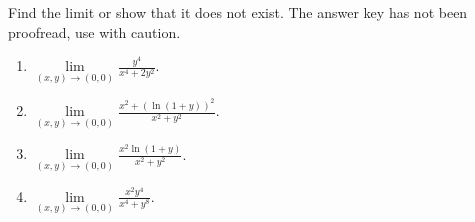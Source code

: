 Find the limit or show that it does not exist. The answer key has not been proofread, use with caution.

\begin{enumerate}
\item  \label{problem-lim-xytozero-(y^4)/(x^4+2y^2)} $\displaystyle \lim\limits_{(x,y)\to (0,0)}\frac{ y^4}{x^4+2y^2}$.


\item $\displaystyle \lim\limits_{(x,y)\to (0,0)} \frac{x^2+\left(\ln (1+y)\right)^2}{x^2+y^2}$.


\item $\displaystyle \lim\limits_{(x,y)\to (0,0)} \frac{x^2\ln (1+y)}{x^2+y^2}$.


\item $\displaystyle \lim\limits_{(x,y)\to (0,0)} \frac{x^2y^4}{x^4+y^8} .$


\end{enumerate}